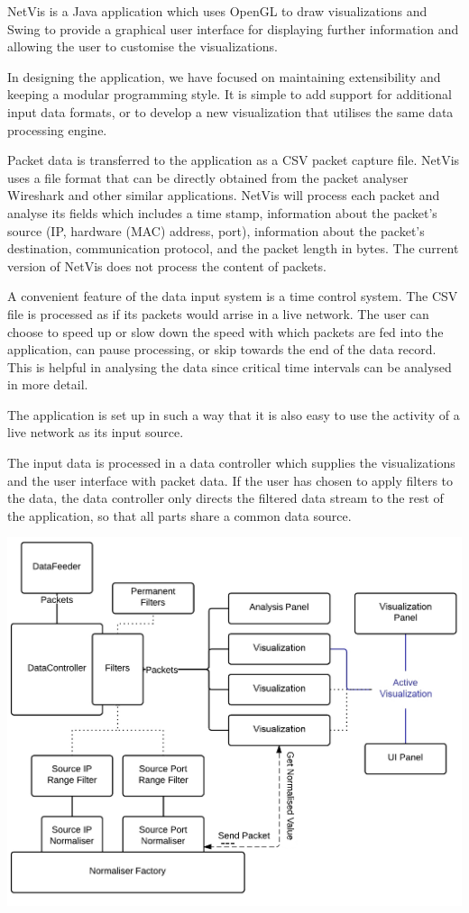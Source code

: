 NetVis is a Java application which uses OpenGL to draw visualizations and Swing to provide a graphical user interface for displaying further information and allowing the user to customise the visualizations.

In designing the application, we have focused on maintaining extensibility and keeping a modular programming style. It is simple to add support for additional input data formats, or to develop a new visualization that utilises the same data processing engine.

Packet data is transferred to the application as a CSV packet capture file. NetVis uses a file format that can be directly obtained from the packet analyser Wireshark and other similar applications. NetVis will process each packet and analyse its fields which includes a time stamp, information about the packet's source (IP, hardware (MAC) address, port), information about the packet's destination, communication protocol, and the packet length in bytes.
The current version of NetVis does not process the content of packets.

A convenient feature of the data input system is a time control system. The CSV file is processed as if its packets would arrise in a live network. The user can choose to speed up or slow down the speed with which packets are fed into the application, can pause processing, or skip towards the end of the data record. This is helpful in analysing the data since critical time intervals can be analysed in more detail.

The application is set up in such a way that it is also easy to use the activity of a live network as its input source.

The input data is processed in a data controller which supplies the visualizations and the user interface with packet data. If the user has chosen to apply filters to the data, the data controller only directs the filtered data stream to the rest of the application, so that all parts share a common data source.

\includegraphics[width=\linewidth]{materials/architecture.jpg}

